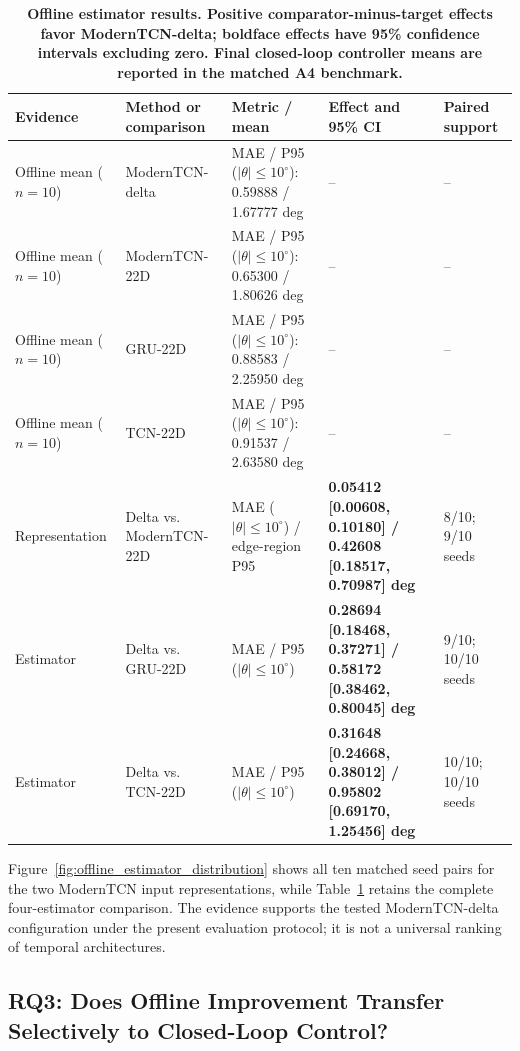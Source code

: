 \documentclass{ieeeaccess}
\begin{document}
\begin{table}[!t]
\centering
\caption{\textbf{Offline estimator results. Positive comparator-minus-target effects favor ModernTCN-delta; boldface effects have 95\% confidence intervals excluding zero. Final closed-loop controller means are reported in the matched A4 benchmark.}}
\label{tab:estimator_and_delta_results}
\scriptsize
\setlength{\tabcolsep}{3.0pt}
\setlength{\tabcolsep}{3pt}
\begin{tabular}{|p{}|p{}|p{}|p{}|p{}|}
\hline
Evidence & Method or comparison & Metric / mean & Effect and 95\% CI & Paired support \\
\hline
Offline mean ($n=10$) & ModernTCN-delta & MAE / P95 ($|\theta|\leq10^{\circ}$): 0.59888 / 1.67777 deg & -- & -- \\
Offline mean ($n=10$) & ModernTCN-22D & MAE / P95 ($|\theta|\leq10^{\circ}$): 0.65300 / 1.80626 deg & -- & -- \\
Offline mean ($n=10$) & GRU-22D & MAE / P95 ($|\theta|\leq10^{\circ}$): 0.88583 / 2.25950 deg & -- & -- \\
Offline mean ($n=10$) & TCN-22D & MAE / P95 ($|\theta|\leq10^{\circ}$): 0.91537 / 2.63580 deg & -- & -- \\
\hline
Representation & Delta vs. ModernTCN-22D & MAE ($|\theta|\leq10^{\circ}$) / edge-region P95 & \textbf{0.05412 [0.00608, 0.10180] / 0.42608 [0.18517, 0.70987] deg} & 8/10; 9/10 seeds \\
Estimator & Delta vs. GRU-22D & MAE / P95 ($|\theta|\leq10^{\circ}$) & \textbf{0.28694 [0.18468, 0.37271] / 0.58172 [0.38462, 0.80045] deg} & 9/10; 10/10 seeds \\
Estimator & Delta vs. TCN-22D & MAE / P95 ($|\theta|\leq10^{\circ}$) & \textbf{0.31648 [0.24668, 0.38012] / 0.95802 [0.69170, 1.25456] deg} & 10/10; 10/10 seeds \\
\hline
\end{tabular}
\end{table}

Figure~\ref{fig:offline_estimator_distribution} shows all ten matched seed pairs for the two ModernTCN input representations, while Table~\ref{tab:estimator_and_delta_results} retains the complete four-estimator comparison. The evidence supports the tested ModernTCN-delta configuration under the present evaluation protocol; it is not a universal ranking of temporal architectures.

\subsection{RQ3: Does Offline Improvement Transfer Selectively to Closed-Loop Control?}
\end{document}
